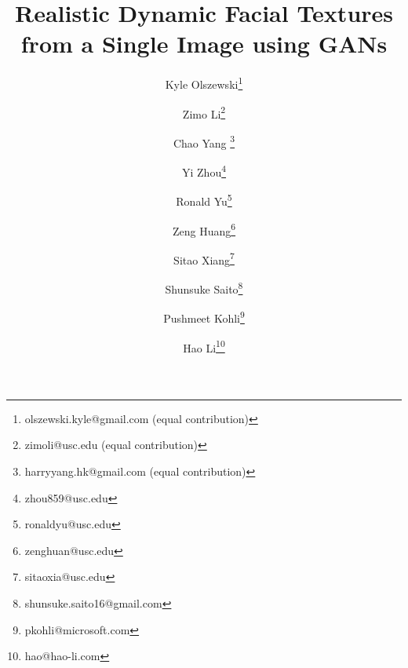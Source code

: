 \documentclass[10pt,twocolumn,letterpaper]{article}
\begin{document}
\title{Realistic Dynamic Facial Textures from a Single Image using GANs}


\author[1,3,4]{Kyle Olszewski\thanks{olszewski.kyle@gmail.com (equal contribution)}}
\author[1]{Zimo Li\thanks{zimoli@usc.edu (equal contribution)}}
\author[1]{Chao Yang \thanks{harryyang.hk@gmail.com (equal contribution)}}
\author[1]{Yi Zhou\thanks{zhou859@usc.edu}}
\author[1,3]{Ronald Yu\thanks{ronaldyu@usc.edu}}
\author[1]{Zeng Huang\thanks{zenghuan@usc.edu}}
\author[1]{Sitao Xiang\thanks{sitaoxia@usc.edu}}
\author[1,3]{Shunsuke Saito\thanks{shunsuke.saito16@gmail.com}}
\author[2]{Pushmeet Kohli\thanks{pkohli@microsoft.com}}
\author[1,3,4]{Hao Li\thanks{hao@hao-li.com}}

\maketitle
\thispagestyle{empty}
\end{document}
